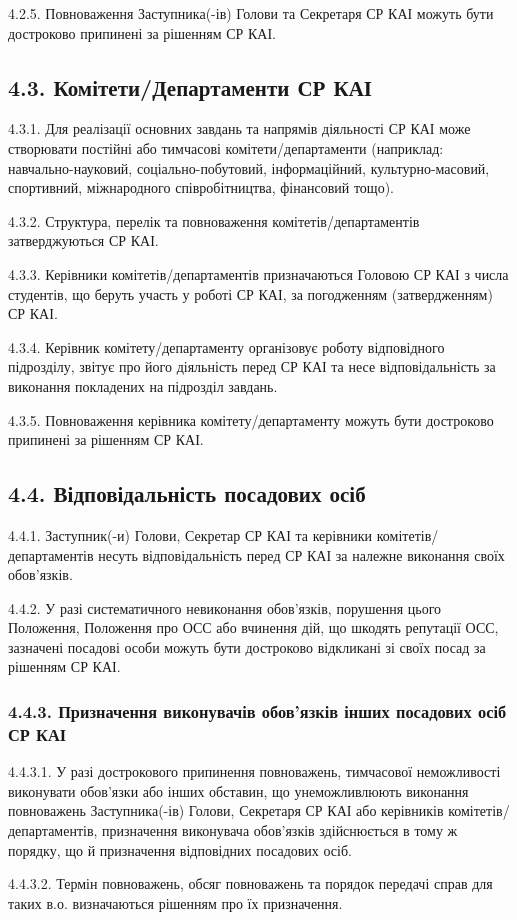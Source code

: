     4.2.5. Повноваження Заступника(-ів) Голови та Секретаря СР КАІ можуть бути достроково припинені за рішенням СР КАІ.

\subsection*{4.3. Комітети/Департаменти СР КАІ}
    4.3.1. Для реалізації основних завдань та напрямів діяльності СР КАІ може створювати постійні або тимчасові комітети/департаменти (наприклад: навчально-науковий, соціально-побутовий, інформаційний, культурно-масовий, спортивний, міжнародного співробітництва, фінансовий тощо).

    4.3.2. Структура, перелік та повноваження комітетів/департаментів затверджуються СР КАІ.

    4.3.3. Керівники комітетів/департаментів призначаються Головою СР КАІ з числа студентів, що беруть участь у роботі СР КАІ, за погодженням (затвердженням) СР КАІ.

    4.3.4. Керівник комітету/департаменту організовує роботу відповідного підрозділу, звітує про його діяльність перед СР КАІ та несе відповідальність за виконання покладених на підрозділ завдань.

    4.3.5. Повноваження керівника комітету/департаменту можуть бути достроково припинені за рішенням СР КАІ.

\subsection*{4.4. Відповідальність посадових осіб}
    4.4.1. Заступник(-и) Голови, Секретар СР КАІ та керівники комітетів/департаментів несуть відповідальність перед СР КАІ за належне виконання своїх обов'язків.

    4.4.2. У разі систематичного невиконання обов'язків, порушення цього Положення, Положення про ОСС або вчинення дій, що шкодять репутації ОСС, зазначені посадові особи можуть бути достроково відкликані зі своїх посад за рішенням СР КАІ.
     
    \subsubsection*{4.4.3. Призначення виконувачів обов'язків інших посадових осіб СР КАІ}
        4.4.3.1. У разі дострокового припинення повноважень, тимчасової неможливості виконувати обов'язки або інших обставин, що унеможливлюють виконання повноважень Заступника(-ів) Голови, Секретаря СР КАІ або керівників комітетів/департаментів, призначення виконувача обов'язків здійснюється в тому ж порядку, що й призначення відповідних посадових осіб.
         
        4.4.3.2. Термін повноважень, обсяг повноважень та порядок передачі справ для таких в.о. визначаються рішенням про їх призначення. 